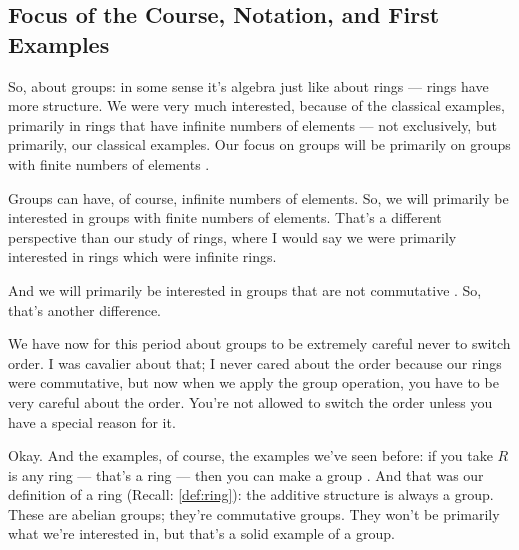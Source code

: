 \subsection{Focus of the Course, Notation, and First Examples}

\begin{speech}[00:48:15 - 00:50:18]
So, about groups: in some sense it's algebra just like about rings --- rings have more structure. We were very much interested, because of the classical examples, primarily in rings that have infinite numbers of elements --- not exclusively, but primarily, our classical examples. Our focus on groups will be primarily on groups with finite numbers of elements .

Groups can have, of course, infinite numbers of elements. So, we will primarily be interested in groups with finite numbers of elements. That's a different perspective than our study of rings, where I would say we were primarily interested in rings which were infinite rings.

And we will primarily be interested in groups that are not commutative . So, that's another difference.

We have now for this period about groups to be extremely careful never to switch order. I was cavalier about that; I never cared about the order because our rings were commutative, but now when we apply the group operation, you have to be very careful about the order. You're not allowed to switch the order unless you have a special reason for it.

Okay. And the examples, of course, the examples we've seen before: if you take $R$ is any ring --- that's a ring --- then you can make a group . And that was our definition of a ring (Recall: \cref{def:ring}): the additive structure is always a group. These are abelian groups; they're commutative groups. They won't be primarily what we're interested in, but that's a solid example of a group.
\end{speech}

